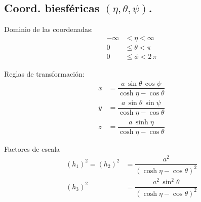 \subsection{Coord. biesféricas \texorpdfstring{$(\eta, \theta, \psi)$}{(e, t, p)}.}

Dominio de las coordenadas:
\begin{align*}
-\infty &< \eta < \infty \\
0 &\leq \theta < \pi \\
0 &\leq \phi < 2\, \pi
\end{align*}

Reglas de transformación:
\begin{align*}
x &= \dfrac{a \, \sin \theta \, \cos \psi}{\cosh \eta - \cos \theta} \\[0.5em]
y &= \dfrac{a \, \sin \theta \, \sin \psi}{\cosh \eta - \cos \theta} \\[0.5em]
z &= \dfrac{a \, \sinh \eta}{\cosh \eta - \cos \theta}
\end{align*}

Factores de escala
\begin{align*}
(h_{1})^{2} = (h_{2})^{2} &= \dfrac{a^{2}}{(\cosh \eta - \cos \theta)^{2}} \\[0.5em]
(h_{3})^{2} &= \dfrac{a^{2} \, \sin^{2} \theta}{(\cosh \eta - \cos \theta)^{2}}
\end{align*}

